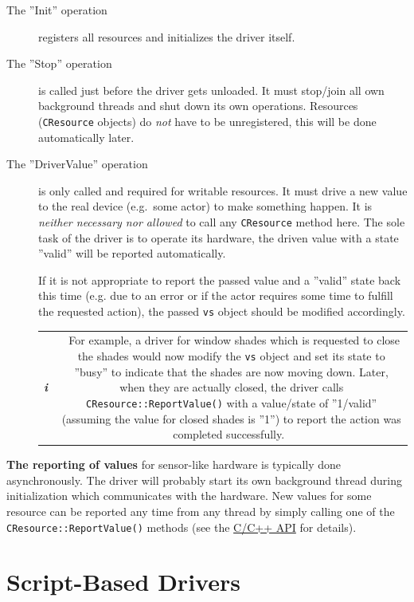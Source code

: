 \documentclass[12pt,english,parskip=half]{scrreprt}
\newcommand{\projecturl}{}
\newcommand{\infobox}[1]{
  \hfill
  \setlength\arrayrulewidth{1pt}
  \begin{tabular}[t]{c|c|}
    \parbox{1.8em}{\hfill\textit{\Huge\textbf{i}\,}}
    &
    \,\parbox{0.89\linewidth}{\setlength{\parskip}{0.5em}#1}\,
  \end{tabular}
  \par
}
\newcommand{\docref}[2]{\href{\projecturl#1}{#2}}
\newcommand{\refapic}{\docref{home2l-api_c/index.html}{C/C++ API}}
\begin{document}
\begin{description}

\item[The ''Init'' operation]
  registers all resources and initializes the driver itself.

\item[The ''Stop'' operation]
  is called just before the driver gets unloaded. It must stop/join all own background
  threads and shut down its own operations.
  Resources (\texttt{CResource} objects) do \emph{not} have to be unregistered,
  this will be done automatically later.

\item[The ''DriverValue'' operation]
  is only called and required for writable resources. It must drive a new value
  to the real device (e.g.~some actor) to make something happen.
  It is \emph{neither necessary nor allowed} to call any \texttt{CResource} method here.
  The sole task of the driver is to operate its hardware, the driven value with
  a state ''valid'' will be reported automatically.

  If it is not appropriate to report the passed value and a ''valid'' state back this
  time
  (e.g. due to an error or if the actor requires some time to fulfill the requested action),
  the passed \texttt{vs} object should be modified accordingly.

  \infobox{
    For example, a driver for window shades which is requested to close the shades
    would now modify the \texttt{vs} object and set its state to ''busy'' to indicate
    that the shades are now moving down.
    Later, when they are actually closed, the driver calls \texttt{CResource::ReportValue()}
    with a value/state of ''1/valid'' (assuming the value for closed shades is ''1'')
    to report the action was completed successfully.
  }

\end{description}

\textbf{The reporting of values} for sensor-like hardware is typically done
asynchronously. The driver will probably start its own background thread during
initialization which communicates with the hardware. New values for some
resource can be reported any time from any thread by simply calling one
of the \texttt{CResource::ReportValue()} methods (see the \refapic{} for details).





\section{Script-Based Drivers}
\label{sec:drvdev-external}
\end{document}
